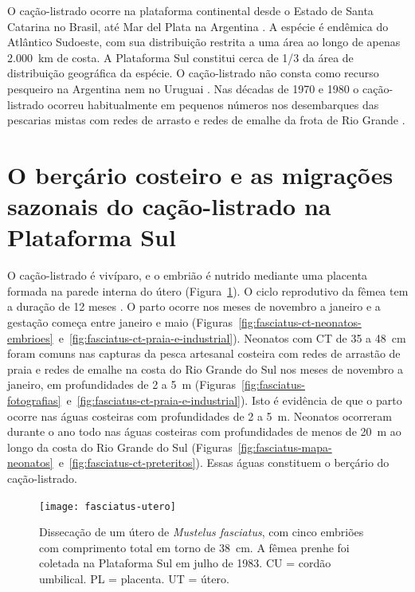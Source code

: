 \documentclass[a4paper,11pt,twoside,showtrims,onecolumn,openright,final]{memoir}
\begin{document}
O cação-listrado ocorre na plataforma continental desde o Estado de Santa Catarina no Brasil, 
até Mar del Plata na Argentina \citep{menni1984,soto2001a}. %
A espécie é endêmica do Atlântico 
Sudoeste, com sua distribuição restrita a uma área ao longo de apenas 2.000~km de costa. 
A Plataforma  Sul constitui cerca de 1/3 da área de distribuição geográfica da espécie. 
O cação-listrado não consta como recurso pesqueiro na Argentina nem no Uruguai 
\citep{meneses1999,cousseau2000}. %
Nas décadas de 1970 e 1980 o cação-listrado ocorreu habitualmente em pequenos números nos 
desembarques das pescarias mistas com redes de arrasto e redes de emalhe 
da frota de Rio Grande \citep{araujo1986}. %

\section*{O berçário costeiro e as migrações sazonais do cação-listrado na Plataforma Sul}

O cação-listrado é vivíparo, e o embrião é nutrido mediante uma placenta formada 
na parede interna do útero (Figura~\ref{fig:fasciatus-fotografia-utero}). 
O ciclo reprodutivo da fêmea tem a duração de 12 meses \citep{vooren1992}. %
O  parto ocorre nos meses de novembro a janeiro e a gestação começa entre janeiro e maio (Figuras~\ref{fig:fasciatus-ct-neonatos-embrioes}~e~\ref{fig:fasciatus-ct-praia-e-industrial}). 
Neonatos com CT de 35 a 48~cm foram comuns nas capturas da pesca artesanal costeira com redes de 
arrastão de praia e redes de emalhe na costa do Rio Grande do Sul nos meses de novembro 
a janeiro, %
em profundidades de 2 a 5~m (Figuras~\ref{fig:fasciatus-fotografias}~e~\ref{fig:fasciatus-ct-praia-e-industrial}).
Isto é evidência de que o parto ocorre nas águas costeiras com profundidades de 2 a  5~m. 
Neonatos ocorreram durante o ano todo nas águas costeiras com profundidades de menos de 20~m
ao longo da costa do Rio Grande do Sul (Figuras~\ref{fig:fasciatus-mapa-neonatos}~e~\ref{fig:fasciatus-ct-preteritos}).
Essas águas constituem o berçário do cação-listrado.

%
%

\begin{figure}
\begin{center}
\texttt{[image: fasciatus-utero]}
\end{center}
\caption[Dissecação de um útero de \emph{Mustelus fasciatus}, com cinco 
          embriões com comprimento total em torno de 38~cm]
        {Dissecação de um útero de \emph{Mustelus fasciatus}, com cinco 
          embriões com comprimento total em torno de 38~cm. A fêmea prenhe foi coletada na 
	  Plataforma Sul em julho de 1983.  CU = cordão umbilical. PL = placenta. UT = útero.}
\label{fig:fasciatus-fotografia-utero}
\end{figure}
\end{document}
